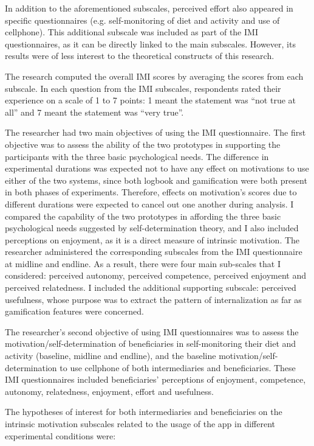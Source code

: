 In addition to the aforementioned subscales, perceived effort also appeared in specific questionnaires (e.g. self-monitoring of diet and activity and use of cellphone). This additional subscale was included as part of the IMI questionnaires, as it can be directly linked to the main subscales. However, its results were of less interest to the theoretical constructs of this research.
  
The research computed the overall IMI scores by averaging the scores from each subscale. In each question from the IMI subscales, respondents rated their experience on a scale of 1 to 7 points: 1 meant the statement was ``not true at all'' and 7 meant the statement was ``very true''.

The researcher had two main objectives of using the IMI questionnaire. The first objective was to assess the ability of the two prototypes in supporting the participants with the three basic psychological needs. The difference in experimental durations was expected not to have any effect on motivations to use either of the two systems, since both logbook and gamification were both present in both phases of experiments. Therefore, effects on motivation's scores due to different durations were expected to cancel out one another during analysis. I compared the capability of the two prototypes in affording the three basic psychological needs suggested by self-determination theory, and I also included perceptions on enjoyment, as it is a direct measure of intrinsic motivation. The researcher administered the corresponding subscales from the IMI questionnaire at midline and endline. As a result, there were four main sub-scales that I considered: perceived autonomy, perceived competence, perceived enjoyment and perceived relatedness. I included the additional supporting subscale: perceived usefulness, whose purpose was to extract the pattern of internalization as far as gamification features were concerned.

The researcher's second objective of using IMI questionnaires was to assess the motivation/self-determination of beneficiaries in self-monitoring their diet and activity (baseline, midline  and endline), and the baseline motivation/self-determination to use cellphone of both intermediaries and beneficiaries. These IMI questionnaires included beneficiaries' perceptions of enjoyment, competence, autonomy, relatedness, enjoyment, effort and usefulness.

The hypotheses of interest for both intermediaries and beneficiaries on the intrinsic motivation subscales related to the usage of the app in different experimental conditions were:

